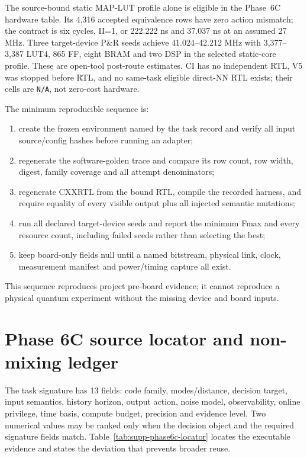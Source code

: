 \documentclass[11pt]{article}
\begin{document}
The source-bound static MAP-LUT profile alone is eligible in the Phase~6C
hardware table.  Its 4,316 accepted equivalence rows have zero action mismatch;
the contract is six cycles, II=1, or 222.222 ns and 37.037 ns at an assumed
27 MHz.  Three target-device P\&R seeds achieve 41.024--42.212 MHz with
3,377--3,387 LUT4, 865 FF, eight BRAM and two DSP in the selected static-core profile.
These are open-tool post-route estimates.  CI has no independent RTL, V5 was
stopped before RTL, and no same-task eligible direct-NN RTL exists; their cells
are \texttt{N/A}, not zero-cost hardware.

The minimum reproducible sequence is:
\begin{enumerate}
  \item create the frozen environment named by the task record and verify all
  input source/config hashes before running an adapter;
  \item regenerate the software-golden trace and compare its row count, row
  width, digest, family coverage and all attempt denominators;
  \item regenerate CXXRTL from the bound RTL, compile the recorded harness, and
  require equality of every visible output plus all injected semantic
  mutations;
  \item run all declared target-device seeds and report the minimum Fmax and
  every resource count, including failed seeds rather than selecting the best;
  \item keep board-only fields null until a named bitstream, physical link,
  clock, measurement manifest and power/timing capture all exist.
\end{enumerate}
This sequence reproduces project pre-board evidence; it cannot reproduce a
physical quantum experiment without the missing device and board inputs.

\section{Phase 6C source locator and non-mixing ledger}

The task signature has 13 fields: code family, modes/distance, decision target,
input semantics, history horizon, output action, noise model, observability,
online privilege, time basis, compute budget, precision and evidence level.
Two numerical values may be ranked only when the decision object and the
required signature fields match.  Table~\ref{tab:supp-phase6c-locator} locates
the executable evidence and states the deviation that prevents broader reuse.
\end{document}

